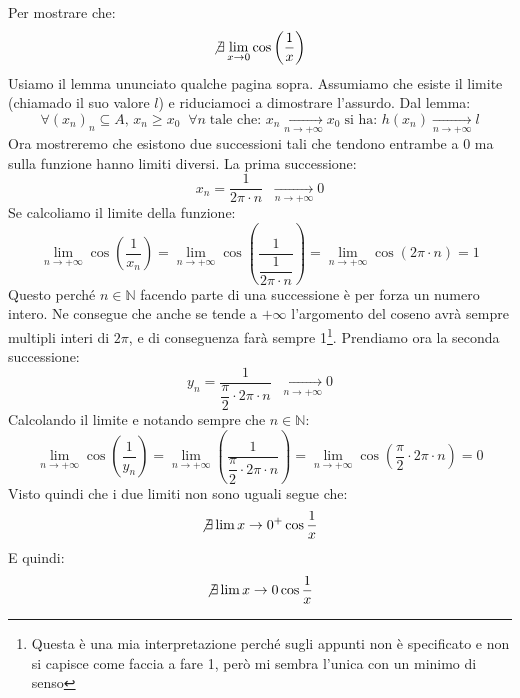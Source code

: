 \begin{itemize}
	Per mostrare che:
	\begin{equation*}
		\not \exists \lim_{x \to 0} \cos \left(\dfrac{1}{x}\right)
	\end{equation*}
	Usiamo il lemma ununciato qualche pagina sopra. Assumiamo che esiste il limite (chiamado il suo valore $l$) e riduciamoci a dimostrare l'assurdo. Dal lemma:
	\begin{equation*}
		\forall (x_n)_n \subseteq A, \, x_n \geq x_0 \;\; \forall n \; \text{tale che: } x_n \xrightarrow[n \to + \infty]{} x_0 \; \text{si ha: } h(x_n) \xrightarrow[n \to +\infty]{} l
	\end{equation*}
	Ora mostreremo che esistono due successioni tali che tendono entrambe a $0$ ma sulla funzione hanno limiti diversi. La prima successione:
	\begin{equation*}
		x_n = \dfrac{1}{2 \pi \cdot n} \;\; \xrightarrow[n \to +\infty]{} 0
	\end{equation*}
	Se calcoliamo il limite della funzione:
	\begin{equation*}
		\lim_{n \to +\infty} \cos \left(\dfrac{1}{x_n}\right) = \lim_{n \to +\infty} \cos \left(\dfrac{1}{\dfrac{1}{2 \pi \cdot n}}\right) = \lim_{n \to +\infty} \cos(2\pi \cdot n) = 1
	\end{equation*}
	Questo perché $n \in \mathbb{N}$ facendo parte di una successione è per forza un numero intero. Ne consegue che anche se tende a $+\infty$ l'argomento del coseno avrà sempre multipli interi di $2\pi$, e di conseguenza farà sempre 1\footnote{Questa è una mia interpretazione perché sugli appunti non è specificato e non si capisce come faccia a fare 1, però mi sembra l'unica con un minimo di senso}. Prendiamo ora la seconda successione:
	\begin{equation*}
		y_n = \dfrac{1}{\dfrac{\pi}{2} \cdot 2\pi \cdot n} \;\; \xrightarrow[n \to +\infty]{} 0
	\end{equation*}
	Calcolando il limite e notando sempre che $n \in \mathbb{N}$:
	\begin{equation*}
		\lim_{n \to +\infty} \cos \left( \dfrac{1}{y_n} \right) = \lim_{n \to +\infty} \left(  \dfrac{1}{\dfrac{\pi}{2} \cdot 2\pi \cdot n} \right) = \lim_{n \to +\infty} \cos \left( \dfrac{\pi}{2} \cdot 2\pi \cdot n \right) = 0
	\end{equation*}
	Visto quindi che i due limiti non sono uguali segue che:
	\begin{equation*}
		\not \exists \lim{x \to 0^+} \cos \dfrac{1}{x}
	\end{equation*}
	E quindi:
	\begin{equation*}
		\not \exists \lim{x \to 0} \cos \dfrac{1}{x}
	\end{equation*}


\end{itemize}

